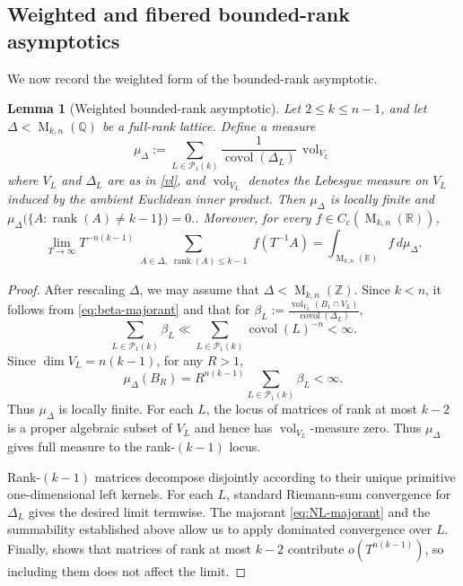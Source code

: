 \documentclass[reqno,11pt]{amsart}
\numberwithin{equation}{section}
\newtheorem{lemma}[theorem]{Lemma}
\theoremstyle{definition}
\theoremstyle{remark}
\newcommand{\op}{\operatorname}
\newcommand{\rank}{\op{rank}}
\newcommand{\vol}{\op{vol}}
\newcommand{\M}{\op{M}}
\newcommand{\covol}{\op{covol}}
\begin{document}
\subsection{Weighted and fibered bounded-rank asymptotics}
We now record the weighted form of the bounded-rank asymptotic. 
\begin{lemma}[Weighted bounded-rank asymptotic]
\label{lem:weighted-bounded-rank}
Let $2\le k\le n-1$, and let
$\Delta<\M_{k,n}(\mathbb Q)$ be a full-rank lattice. Define a measure
$$
\mu_\Delta
:=
\sum_{L\in\mathcal P_1(k)}
\frac{1}{\covol(\Delta_L)}\,\vol_{V_L}
$$ where $V_L$ and $\Delta_L$ are as in \eqref{vl}, and
$\vol_{V_L}$ denotes the Lebesgue measure on $V_L$ induced by the
ambient Euclidean inner product.
Then $\mu_\Delta$ is locally finite and $
\mu_\Delta\bigl(\{A:\rank(A)\ne k-1\}\bigr)=0.
$. Moreover, for every
$f\in C_c(\M_{k,n}(\mathbb R))$,
\begin{equation}\label{eq:boundedrankasymptotic}
\lim_{T\to \infty} T^{-n(k-1)}
\sum_{\substack{A\in\Delta,\;  \rank(A)\le k-1}}
f(T^{-1}A) =
\int_{\M_{k,n}(\mathbb R)}f\,d\mu_\Delta.
\end{equation}
\end{lemma}


\begin{proof} After rescaling $\Delta$, we may assume that
$\Delta<\M_{k,n}(\mathbb Z)$. Since $k<n$, it follows from \eqref{eq:beta-majorant} and
 that for $\beta_L:=\frac{\vol_{V_L}(B_1\cap V_L)}{\covol(\Delta_L)}$,
$$
\sum_{L\in\mathcal P_1(k)}\beta_L
\ll
\sum_{L\in\mathcal P_1(k)}\covol(L)^{-n}
<\infty.
$$
Since
$\dim V_L=n(k-1)$, for any $R>1$, 
$$
\mu_\Delta(B_R) = R^{n(k-1)}
\sum_{L\in\mathcal P_1(k)}\beta_L
<\infty.
$$
Thus $\mu_\Delta$ is locally finite.
For each $L$, the locus of matrices of rank at most $k-2$ is a proper algebraic subset
of $V_L$ and hence has $\vol_{V_L}$-measure zero. Thus $\mu_\Delta$ gives full measure to the rank-$(k-1)$ locus.

Rank-$(k-1)$ matrices decompose disjointly according to their unique
primitive one-dimensional left kernels. For each $L$, standard Riemann-sum
convergence for $\Delta_L$ gives the desired limit termwise. The majorant
\eqref{eq:NL-majorant} and the summability established above allow us to apply
dominated convergence over $L$. Finally,  shows that
matrices of rank at most $k-2$ contribute $o(T^{n(k-1)})$, so including
them does not affect the limit.
\end{proof}
\end{document}
